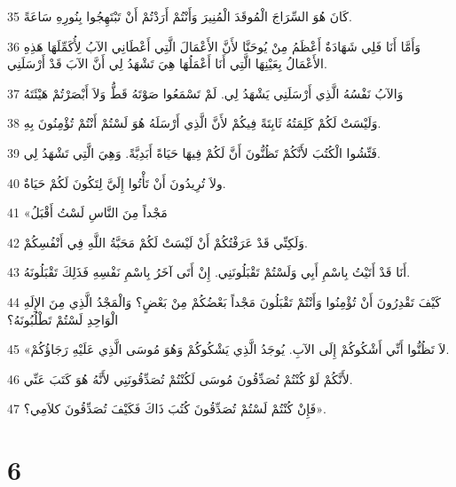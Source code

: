 \par 35 كَانَ هُوَ السِّرَاجَ الْمُوقَدَ الْمُنِيرَ وَأَنْتُمْ أَرَدْتُمْ أَنْ تَبْتَهِجُوا بِنُورِهِ سَاعَةً.
\par 36 وَأَمَّا أَنَا فَلِي شَهَادَةٌ أَعْظَمُ مِنْ يُوحَنَّا لأَنَّ الأَعْمَالَ الَّتِي أَعْطَانِي الآبُ لِأُكَمِّلَهَا هَذِهِ الأَعْمَالُ بِعَيْنِهَا الَّتِي أَنَا أَعْمَلُهَا هِيَ تَشْهَدُ لِي أَنَّ الآبَ قَدْ أَرْسَلَنِي.
\par 37 وَالآبُ نَفْسُهُ الَّذِي أَرْسَلَنِي يَشْهَدُ لِي. لَمْ تَسْمَعُوا صَوْتَهُ قَطُّ وَلاَ أَبْصَرْتُمْ هَيْئَتَهُ
\par 38 وَلَيْسَتْ لَكُمْ كَلِمَتُهُ ثَابِتَةً فِيكُمْ لأَنَّ الَّذِي أَرْسَلَهُ هُوَ لَسْتُمْ أَنْتُمْ تُؤْمِنُونَ بِهِ.
\par 39 فَتِّشُوا الْكُتُبَ لأَنَّكُمْ تَظُنُّونَ أَنَّ لَكُمْ فِيهَا حَيَاةً أَبَدِيَّةً. وَهِيَ الَّتِي تَشْهَدُ لِي.
\par 40 ولاَ تُرِيدُونَ أَنْ تَأْتُوا إِلَيَّ لِتَكُونَ لَكُمْ حَيَاةٌ.
\par 41 «مَجْداً مِنَ النَّاسِ لَسْتُ أَقْبَلُ
\par 42 وَلَكِنِّي قَدْ عَرَفْتُكُمْ أَنْ لَيْسَتْ لَكُمْ مَحَبَّةُ اللَّهِ فِي أَنْفُسِكُمْ.
\par 43 أَنَا قَدْ أَتَيْتُ بِاسْمِ أَبِي وَلَسْتُمْ تَقْبَلُونَنِي. إِنْ أَتَى آخَرُ بِاسْمِ نَفْسِهِ فَذَلِكَ تَقْبَلُونَهُ.
\par 44 كَيْفَ تَقْدِرُونَ أَنْ تُؤْمِنُوا وَأَنْتُمْ تَقْبَلُونَ مَجْداً بَعْضُكُمْ مِنْ بَعْضٍ؟ وَالْمَجْدُ الَّذِي مِنَ الإِلَهِ الْوَاحِدِ لَسْتُمْ تَطْلُبُونَهُ؟
\par 45 «لاَ تَظُنُّوا أَنِّي أَشْكُوكُمْ إِلَى الآبِ. يُوجَدُ الَّذِي يَشْكُوكُمْ وَهُوَ مُوسَى الَّذِي عَلَيْهِ رَجَاؤُكُمْ.
\par 46 لأَنَّكُمْ لَوْ كُنْتُمْ تُصَدِّقُونَ مُوسَى لَكُنْتُمْ تُصَدِّقُونَنِي لأَنَّهُ هُوَ كَتَبَ عَنِّي.
\par 47 فَإِنْ كُنْتُمْ لَسْتُمْ تُصَدِّقُونَ كُتُبَ ذَاكَ فَكَيْفَ تُصَدِّقُونَ كلاَمِي؟».

\chapter{6}

